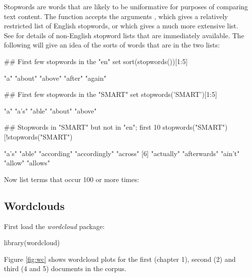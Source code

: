 Stopwords are words that are likely to be uniformative for purposes
of comparing text content.  The function  
accepts the arguments , which gives a relatively
restricted list of English stopwords, or  which
gives a much more extensive list.  See  for
details of non-English stopword lists that are immediately available.
The following will give an idea of the sorts of words that are in
the two lists:
\begin{Schunk}
\begin{Sinput}
## First few stopwords in the "en" set
sort(stopwords())[1:5]
\end{Sinput}
\begin{Soutput}
[1] "a"     "about" "above" "after" "again"
\end{Soutput}
\begin{Sinput}
## First few stopwords in the "SMART" set 
stopwords('SMART')[1:5]
\end{Sinput}
\begin{Soutput}
[1] "a"     "a's"   "able"  "about" "above"
\end{Soutput}
\begin{Sinput}
## Stopwords in "SMART" but not in "en"; first 10
stopwords("SMART")[!stopwords("SMART")%
\end{Sinput}
\begin{Soutput}
 [1] "a's"         "able"        "according"   "accordingly" "across"     
 [6] "actually"    "afterwards"  "ain't"       "allow"       "allows"     
\end{Soutput}
\end{Schunk}

Now list terms that occur 100 or more times:
\begin{fullwidth}

\end{fullwidth}

\subsection*{Wordclouds}

First load the {\em wordcloud} package:
\begin{Schunk}
\begin{Sinput}
library(wordcloud)
\end{Sinput}
\end{Schunk}

Figure \ref{fig:wc} shows wordcloud plots for the first (chapter 1),
second (2) and third (4 and 5) documents in the corpus.
\vspace*{15pt}

